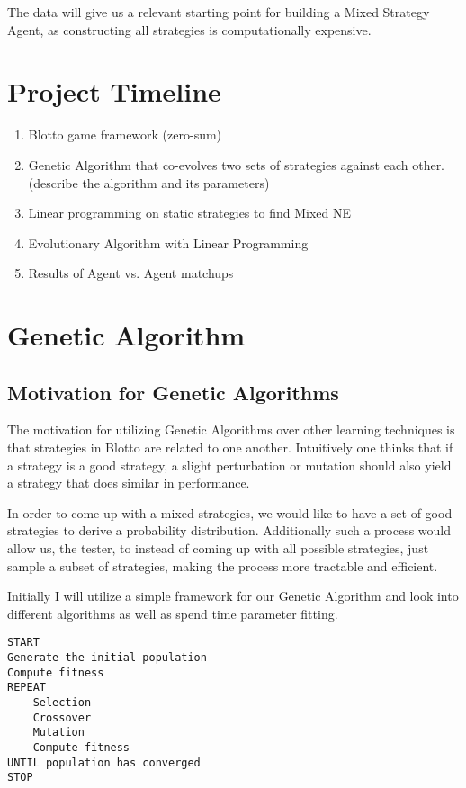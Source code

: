 \documentclass[12pt,letter]{article}
\begin{document}
The data will give us a relevant starting point for building a Mixed Strategy Agent, as constructing all strategies is computationally expensive.

\section{Project Timeline}
\begin{enumerate}
	\item Blotto game framework (zero-sum)
	\item Genetic Algorithm that co-evolves two sets of strategies against each other. (describe the algorithm and its parameters)
	\item Linear programming on static strategies to find Mixed NE
	\item Evolutionary Algorithm with Linear Programming
	\item Results of Agent vs. Agent matchups
\end{enumerate}


\section{Genetic Algorithm} %
\subsection{Motivation for Genetic Algorithms} %
The motivation for utilizing Genetic Algorithms over other learning techniques is that strategies in Blotto are related to one another. Intuitively one thinks that if a strategy is a good strategy, a slight perturbation or mutation should also yield a strategy that does similar in performance.

In order to come up with a mixed strategies, we would like to have a set of good strategies to derive a probability distribution. Additionally such a process would allow us, the tester, to instead of coming up with all possible strategies, just sample a subset of strategies, making the process more tractable and efficient.

Initially I will utilize a simple framework for our Genetic Algorithm and look into different algorithms as well as spend time parameter fitting.
\begin{lstlisting}[mathescape, tabsize=4, basicstyle=\fontfamily{lmvtt}\selectfont,]
START
Generate the initial population
Compute fitness
REPEAT
    Selection
    Crossover
    Mutation
    Compute fitness
UNTIL population has converged
STOP
\end{lstlisting}
\end{document}
